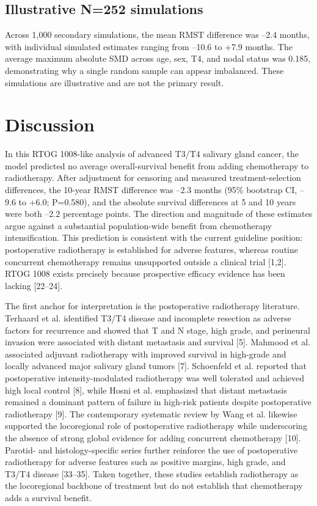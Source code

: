 \documentclass[10pt,twocolumn]{article}
\begin{document}
\subsection{Illustrative N=252 simulations}
Across 1,000 secondary simulations, the mean RMST difference was --2.4 months, with individual simulated estimates ranging from --10.6 to +7.9 months. The average maximum absolute SMD across age, sex, T4, and nodal status was 0.185, demonstrating why a single random sample can appear imbalanced. These simulations are illustrative and are not the primary result.\par
\section{Discussion}
In this RTOG 1008-like analysis of advanced T3/T4 salivary gland cancer, the model predicted no average overall-survival benefit from adding chemotherapy to radiotherapy. After adjustment for censoring and measured treatment-selection differences, the 10-year RMST difference was --2.3 months (95\% bootstrap CI, --9.6 to +6.0; P=0.580), and the absolute survival differences at 5 and 10 years were both --2.2 percentage points. The direction and magnitude of these estimates argue against a substantial population-wide benefit from chemotherapy intensification. This prediction is consistent with the current guideline position: postoperative radiotherapy is established for adverse features, whereas routine concurrent chemotherapy remains unsupported outside a clinical trial [1,2]. RTOG 1008 exists precisely because prospective efficacy evidence has been lacking [22--24].\par
The first anchor for interpretation is the postoperative radiotherapy literature. Terhaard et al. identified T3/T4 disease and incomplete resection as adverse factors for recurrence and showed that T and N stage, high grade, and perineural invasion were associated with distant metastasis and survival [5]. Mahmood et al. associated adjuvant radiotherapy with improved survival in high-grade and locally advanced major salivary gland tumors [7]. Schoenfeld et al. reported that postoperative intensity-modulated radiotherapy was well tolerated and achieved high local control [8], while Hosni et al. emphasized that distant metastasis remained a dominant pattern of failure in high-risk patients despite postoperative radiotherapy [9]. The contemporary systematic review by Wang et al. likewise supported the locoregional role of postoperative radiotherapy while underscoring the absence of strong global evidence for adding concurrent chemotherapy [10]. Parotid- and histology-specific series further reinforce the use of postoperative radiotherapy for adverse features such as positive margins, high grade, and T3/T4 disease [33--35]. Taken together, these studies establish radiotherapy as the locoregional backbone of treatment but do not establish that chemotherapy adds a survival benefit.\par
\end{document}
